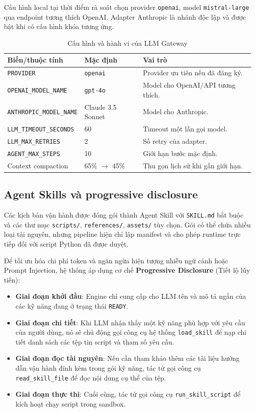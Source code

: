 \documentclass[12pt,a4paper]{article}
\begin{document}
Cấu hình local tại thời điểm rà soát chọn provider \texttt{openai}, model \texttt{mistral-large} qua endpoint tương thích OpenAI. Adapter Anthropic là nhánh độc lập và được bật khi có cấu hình khóa tương ứng.

\begin{table}[H]
\centering
\caption{Cấu hình và hành vi của LLM Gateway}
\label{tab:llm-config}
\begin{tabularx}{\textwidth}{p{}p{}X}
\toprule
\textbf{Biến/thuộc tính} & \textbf{Mặc định} & \textbf{Vai trò} \\
\midrule
\texttt{PROVIDER} & \texttt{openai} & Provider ưu tiên nếu đã đăng ký. \\
\texttt{OPENAI\_MODEL\_NAME} & \texttt{gpt-4o} & Model cho OpenAI/API tương thích. \\
\texttt{ANTHROPIC\_MODEL\_NAME} & Claude 3.5 Sonnet & Model cho Anthropic. \\
\texttt{LLM\_TIMEOUT\_SECONDS} & 60 & Timeout một lần gọi model. \\
\texttt{LLM\_MAX\_RETRIES} & 2 & Số retry của adapter. \\
\texttt{AGENT\_MAX\_STEPS} & 10 & Giới hạn bước mặc định. \\
Context compaction & 65\% $\rightarrow$ 45\% & Thu gọn lịch sử khi gần giới hạn. \\
\bottomrule
\end{tabularx}
\end{table}

\subsection{Agent Skills và progressive disclosure}
Các kịch bản vận hành được đóng gói thành Agent Skill với \texttt{SKILL.md} bắt buộc và các thư mục \texttt{scripts/}, \texttt{references/}, \texttt{assets/} tùy chọn. Gói có thể chứa nhiều loại tài nguyên, nhưng pipeline hiện chỉ lập manifest và cho phép runtime trực tiếp đối với script Python đã được duyệt.

Để tối ưu hóa chi phí token và ngăn ngừa hiện tượng nhiễu ngữ cảnh hoặc Prompt Injection, hệ thống áp dụng cơ chế \textbf{Progressive Disclosure} (Tiết lộ lũy tiến):
\begin{itemize}
    \item \textbf{Giai đoạn khởi đầu}: Engine chỉ cung cấp cho LLM tên và mô tả ngắn của các kỹ năng đang ở trạng thái \texttt{READY}.
    \item \textbf{Giai đoạn chi tiết}: Khi LLM nhận thấy một kỹ năng phù hợp với yêu cầu của người dùng, nó sẽ chủ động gọi công cụ hệ thống \texttt{load\_skill} để nạp chi tiết danh sách các tệp tin script và tham số yêu cầu.
    \item \textbf{Giai đoạn đọc tài nguyên}: Nếu cần tham khảo thêm các tài liệu hướng dẫn vận hành đính kèm trong gói kỹ năng, tác tử gọi công cụ \texttt{read\_skill\_file} để đọc nội dung cụ thể của tệp.
    \item \textbf{Giai đoạn thực thi}: Cuối cùng, tác tử gọi công cụ \texttt{run\_skill\_script} để kích hoạt chạy script trong sandbox.
\end{itemize}
\end{document}
